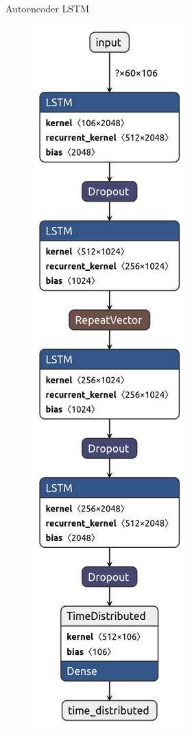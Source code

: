 \documentclass[10pt]{beamer}
\begin{document}
\begin{frame}[fragile]{Autoencoder LSTM}
	\vspace{10px}
	\pause
	
	\begin{figure}[H]
		\centering
		\includegraphics[scale=0.15]{Imagenes/autoencoder-lstm.png}
	\end{figure}
	
\end{frame}
\end{document}
